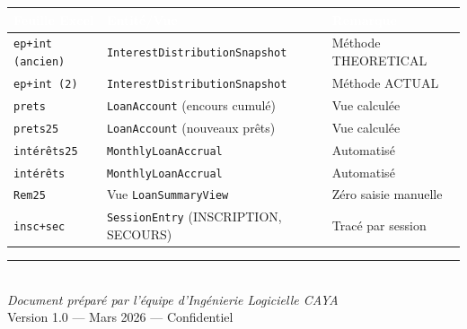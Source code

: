 \documentclass[12pt, a4paper]{report}
\begin{document}
\begin{center}
\small
{}
\begin{tabular}{L{3.5cm}L{4cm}L{5.5cm}}
  \toprule
  \textcolor{white}{\textbf{Feuille Excel}} &
  \textcolor{white}{\textbf{Entité/Vue}} &
  \textcolor{white}{\textbf{Remarque}} \\
  \midrule
  \texttt{ep+int (ancien)}  & \texttt{InterestDistributionSnapshot} & Méthode THEORETICAL \\
  \texttt{ep+int (2)}       & \texttt{InterestDistributionSnapshot} & Méthode ACTUAL \\
  \texttt{prets}            & \texttt{LoanAccount} (encours cumulé) & Vue calculée \\
  \texttt{prets25}          & \texttt{LoanAccount} (nouveaux prêts) & Vue calculée \\
  \texttt{intérêts25}       & \texttt{MonthlyLoanAccrual}           & Automatisé \\
  \texttt{intérêts}         & \texttt{MonthlyLoanAccrual}           & Automatisé \\
  \texttt{Rem25}            & Vue \texttt{LoanSummaryView}          & Zéro saisie manuelle \\
  \texttt{insc+sec}         & \texttt{SessionEntry} (INSCRIPTION, SECOURS) & Tracé par session \\
  \bottomrule
\end{tabular}
\end{center}

\vfill
\begin{center}
  \textcolor{cayaBlue}{\rule{0.5\textwidth}{0.4pt}}\\[0.3cm]
  {\small\textit{Document préparé par l'équipe d'Ingénierie Logicielle CAYA}}\\
  {\small\textcolor{cayaGray!50!black}{Version 1.0 — Mars 2026 — Confidentiel}}
\end{center}
\end{document}
